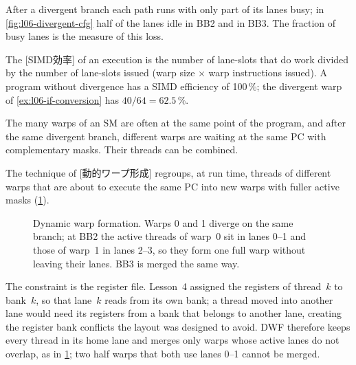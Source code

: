 \documentclass[../main.tex]{subfiles}
\begin{document}
After a divergent branch each path runs with only part of its lanes
busy; in \cref{fig:l06-divergent-cfg} half of the lanes idle in BB2 and
in BB3.  The
fraction of busy lanes is the measure of this loss.

\begin{definition}
  \label{def:l06-simd-efficiency}
  The [SIMD効率] of an execution is the number of
  lane-slots that do work divided by the number of lane-slots issued
  (warp size $\times$ warp instructions issued).  A program without
  divergence has a SIMD efficiency of 100\,\%; the divergent warp of
  \cref{ex:l06-if-conversion} has $40/64 = 62.5\,\%$.
\end{definition}

The many warps of an SM are often at the same point of the program, and
after the same divergent branch, different warps are waiting at the
same PC with complementary masks.  Their threads can be combined.

\begin{definition}
  \label{def:l06-dwf}
  The technique of [動的ワープ形成]
  regroups, at run
  time, threads of different warps that are about to execute the same PC
  into new warps with fuller active masks
  (\cref{fig:l06-dwf}).
\end{definition}

\begin{figure}[tb]
  \centering
  
  \caption{Dynamic warp formation.  Warps 0 and 1 diverge on the same
    branch; at BB2 the active threads of warp~0 sit in lanes 0--1 and
    those of warp~1 in lanes 2--3, so they form one full warp without
    leaving their lanes.  BB3 is merged the same way.}
  \label{fig:l06-dwf}
\end{figure}

The constraint is the register file.  Lesson~4 assigned the registers
of thread~$k$ to bank~$k$, so that lane~$k$ reads from its own bank; a
thread moved into another lane
would need its registers from a bank that belongs to another lane,
creating the register bank conflicts the layout was designed to
avoid.  DWF therefore
keeps every thread in its home lane and merges only warps whose active
lanes do not overlap, as in \cref{fig:l06-dwf}; two half warps that both
use lanes 0--1 cannot be merged.
\end{document}
